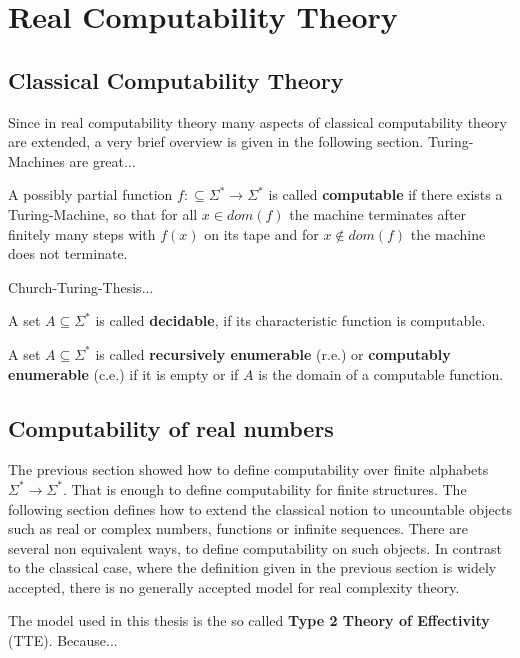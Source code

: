 \section{Real Computability Theory}
\subsection{Classical Computability Theory}
 Since in real computability theory many aspects of classical computability theory are extended, 
 a very brief overview is given in the following section.
 Turing-Machines are great...
 \begin{definition}
 	A possibly partial function $f:\subseteq \Sigma^* \to \Sigma^*$ is called \textbf{computable} if there exists 
 	a Turing-Machine, so that for all $x \in dom(f)$ the machine terminates after finitely many steps with $f(x)$ on its 
 	tape and for $x \not \in dom(f)$ the machine does not terminate.
 \end{definition}

 Church-Turing-Thesis...
 \begin{definition}
 	A set $A \subseteq \Sigma^*$ is called \textbf{decidable}, if its characteristic function is computable. 
 \end{definition}
 \begin{definition}
 	A set $A \subseteq \Sigma^*$ is called \textbf{recursively enumerable} (r.e.) or \textbf{computably enumerable} (c.e.) if 
 	it is empty or if $A$ is the domain of a computable function.   
 \end{definition}
\subsection{Computability of real numbers}
The previous section showed how to define computability over finite alphabets $\Sigma^* \to \Sigma^*$. 
That is enough to define computability for finite structures. The following section defines how to extend 
the classical notion to uncountable objects such as real or complex numbers, functions or infinite sequences.
There are several non equivalent ways, to define computability on such objects. 
In contrast to the classical case, where the definition given in the previous section is widely accepted, there is no 
generally accepted model for real complexity theory.

The model used in this thesis is the so called \textbf{Type 2 Theory of Effectivity} (TTE). 
Because... 

